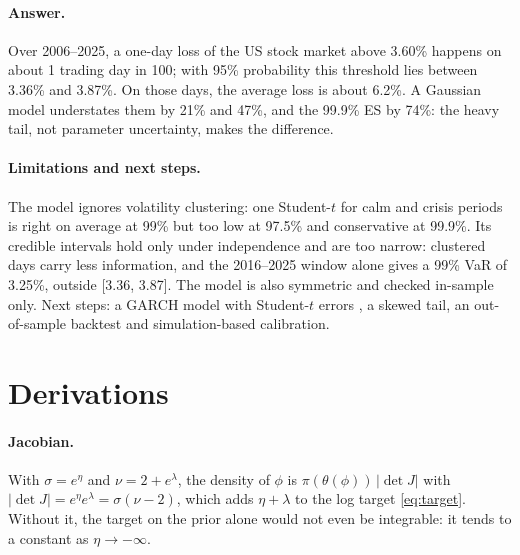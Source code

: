 \documentclass[12pt]{article}
\begin{document}
\paragraph{Answer.} Over 2006--2025, a one-day loss of the US stock market above 3.60\% happens on about 1 trading day in 100; with 95\% probability this threshold lies between 3.36\% and 3.87\%. On those days, the average loss is about 6.2\%. A Gaussian model understates them by 21\% and 47\%, and the 99.9\% ES by 74\%: the heavy tail, not parameter uncertainty, makes the difference.

\paragraph{Limitations and next steps.} The model ignores volatility clustering: one Student-$t$ for calm and crisis periods is right on average at 99\% but too low at 97.5\% and conservative at 99.9\%. Its credible intervals hold only under independence and are too narrow: clustered days carry less information, and the 2016--2025 window alone gives a 99\% VaR of 3.25\%, outside [3.36, 3.87]. The model is also symmetric and checked in-sample only. Next steps: a GARCH model with Student-$t$ errors \cite{bollerslev1986generalized}, a skewed tail, an out-of-sample backtest and simulation-based calibration.





\clearpage
\appendix
{}

\section{Derivations}\label{app:derivations}

\paragraph{Jacobian.} With $\sigma = e^\eta$ and $\nu = 2 + e^\lambda$, the density of $\phi$ is $\pi(\theta(\phi))\,|\det J|$ with $|\det J| = e^{\eta} e^{\lambda} = \sigma(\nu-2)$, which adds $\eta + \lambda$ to the log target \eqref{eq:target}. Without it, the target on the prior alone would not even be integrable: it tends to a constant as $\eta \to -\infty$.
\end{document}
